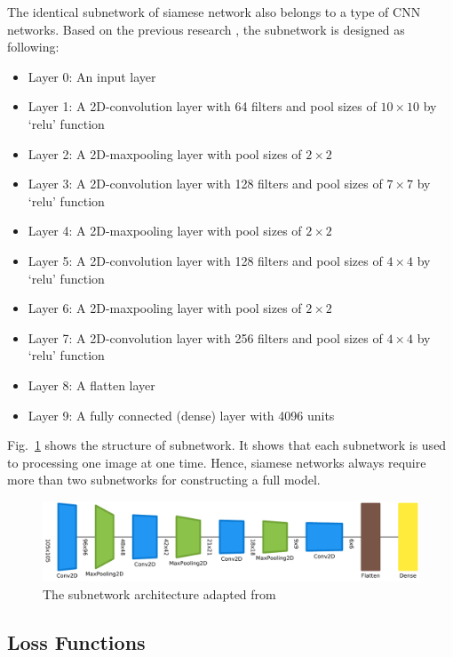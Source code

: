 \documentclass{article}
\begin{document}
The identical subnetwork of siamese network also belongs to a type of CNN networks. Based on the previous research \cite{koch2015siamese}, the subnetwork is designed as following:

\begin{itemize}
  \item Layer 0: An input layer
  \item Layer 1: A 2D-convolution layer with 64 filters and pool sizes of $10\times10$ by `relu' function
  \item Layer 2: A 2D-maxpooling layer with pool sizes of $2\times2$
  \item Layer 3: A 2D-convolution layer with 128 filters and pool sizes of $7\times7$ by `relu' function
  \item Layer 4: A 2D-maxpooling layer with pool sizes of $2\times2$
  \item Layer 5: A 2D-convolution layer with 128 filters and pool sizes of $4\times4$ by `relu' function
  \item Layer 6: A 2D-maxpooling layer with pool sizes of $2\times2$
  \item Layer 7: A 2D-convolution layer with 256 filters and pool sizes of $4\times4$ by `relu' function
  \item Layer 8: A flatten layer
  \item Layer 9: A fully connected (dense) layer with 4096 units

\end{itemize}

Fig.~\ref{subnetwork} shows the structure of subnetwork. It shows that each subnetwork is used to processing one image at one time. Hence, siamese networks always require more than two subnetworks for constructing a full model.

\begin{figure}[b]
  \centering
  \includegraphics[width=\textwidth]{image/graph.pdf}
  \caption{The subnetwork architecture adapted from~\cite{koch2015siamese} }\label{subnetwork}
\end{figure}

\subsection{Loss Functions}
\end{document}
